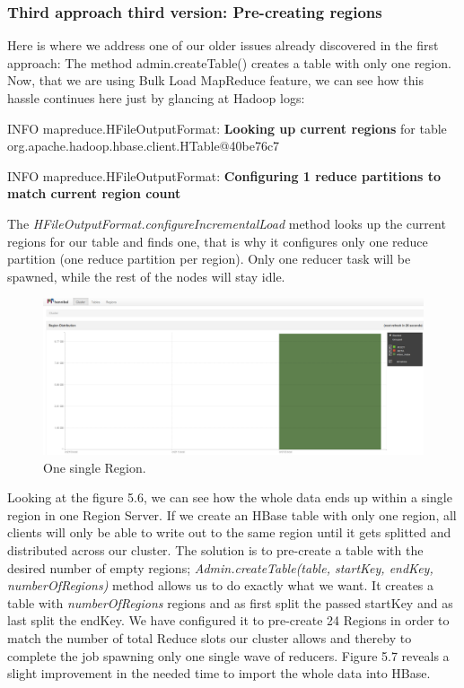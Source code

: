 \subsubsection{Third approach third version: Pre-creating regions}
Here is where we address one of our older issues already discovered in the first approach: The method admin.createTable() creates a table with only one region. Now, that we are using Bulk Load MapReduce feature, we can see how this hassle continues here just by glancing at Hadoop logs:

\bigskip

INFO mapreduce.HFileOutputFormat: \textbf{Looking up current regions} for table org.apache.hadoop.hbase.client.HTable@40be76c7
\par
INFO mapreduce.HFileOutputFormat: \textbf{Configuring 1 reduce partitions to match current region count}

\bigskip

The \textit{HFileOutputFormat.configureIncrementalLoad} method looks up the current regions for our table and finds one, that is why it configures  only one reduce partition (one reduce partition per region). Only one reducer task will be spawned, while the rest of the nodes will stay idle.




\begin{figure}[htb]
\centering
\includegraphics[width=1\textwidth]{./images/1reducer.png}
\caption{One single Region.} \label{fig:oneRegion}
\end{figure}



Looking at the figure 5.6, we can see how the whole data ends up within a single region in one Region Server. If we create an HBase table with only one region, all clients will only be able to write out to the same region until it gets splitted and distributed across our cluster. The solution is to pre-create a table with the desired number of empty regions; \textit{Admin.createTable(table, startKey, endKey, numberOfRegions)} method allows us to do exactly what we want. It creates a table with \textit{numberOfRegions} regions and as first split the passed startKey and as last split the endKey. We have configured it to pre-create 24 Regions in order to match the number of total Reduce slots our cluster allows and thereby to complete the job spawning only one single wave of reducers. Figure 5.7 reveals a slight improvement in the needed time to import the whole data into HBase.


